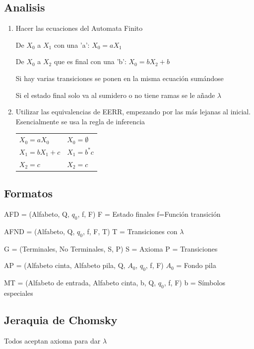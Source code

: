 \documentclass[12pt, twoside, openright]{report} %
\begin{document}
\subsection{Analisis}
\begin{enumerate}
	\item Hacer las ecuaciones del Automata Finito

	      De $X_0$ a $X_1$ con una 'a': $X_0 = aX_1$

	      De $X_0$ a $X_2$ que es final con una 'b': $X_0 = b X_2 + b$

	      Si hay varias transiciones se ponen en la misma ecuación sumándose

	      Si el estado final solo va al sumidero o no tiene ramas se le añade $\lambda$

	\item Utilizar las equivalencias de EERR, empezando por las más lejanas al inicial. Esencialmente se usa la regla de inferencia
	      \begin{table}[H]
		      \centering\begin{tabular}{ll}
			      $X_0 = aX_0$     & $X_0 = \emptyset$ \\
			      $X_1 = bX_1 + c$ & $X_1 = b^*c$      \\
			      $X_2 = c$        & $X_2 = c$         \\
		      \end{tabular}
	      \end{table}
\end{enumerate}

\subsection{Formatos}
AFD = (Alfabeto, Q, $q_0$, f, F) F = Estado finales f=Función transición

AFND = (Alfabeto, Q, $q_0$, f, F, T) T = Transiciones con $\lambda$

G = (Terminales, No Terminales, S, P) S = Axioma P = Transiciones

AP = (Alfabeto cinta, Alfabeto pila, Q, $A_0$, $q_0$, f, F)  $A_0$ = Fondo pila

MT = (Alfabeto de entrada, Alfabeto cinta, b, Q, $q_0$, f, F) b = Símbolos especiales

\subsection{Jeraquia de Chomsky}
Todos aceptan axioma para dar $\lambda$
\end{document}
